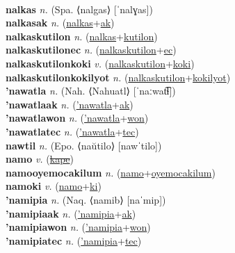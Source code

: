  \label{'nayciwiawon} \\
\textbf{nalkas} \textit{n.} (Spa. ⟨nalgas⟩ [ˈnalɣas])
 \label{nalkas} \\
\textbf{nalkasak} \textit{n.} (\hyperref[nalkas]{nalkas}+\hyperref[ak]{ak})
 \label{nalkasak} \\
\textbf{nalkaskutilon} \textit{n.} (\hyperref[nalkas]{nalkas}+\hyperref[kutilon]{kutilon})
 \label{nalkaskutilon} \\
\textbf{nalkaskutilonec} \textit{n.} (\hyperref[nalkaskutilon]{nalkaskutilon}+\hyperref[ec]{ec})
 \label{nalkaskutilonec} \\
\textbf{nalkaskutilonkoki} \textit{v.} (\hyperref[nalkaskutilon]{nalkaskutilon}+\hyperref[koki]{koki})
 \label{nalkaskutilonkoki} \\
\textbf{nalkaskutilonkokilyot} \textit{n.} (\hyperref[nalkaskutilon]{nalkaskutilon}+\hyperref[kokilyot]{kokilyot})
 \label{nalkaskutilonkokilyot} \\
\textbf{'nawatla} \textit{n.} (Nah. ⟨Nahuatl⟩ [ˈnaːwat͡ɬ])
 \label{'nawatla} \\
\textbf{'nawatlaak} \textit{n.} (\hyperref['nawatla]{'nawatla}+\hyperref[ak]{ak})
 \label{'nawatlaak} \\
\textbf{'nawatlawon} \textit{n.} (\hyperref['nawatla]{'nawatla}+\hyperref[won]{won})
 \label{'nawatlawon} \\
\textbf{'nawatlatec} \textit{n.} (\hyperref['nawatla]{'nawatla}+\hyperref[tec]{tec})
 \label{'nawatlatec} \\
\textbf{nawtil} \textit{n.} (Epo. ⟨naŭtilo⟩ [nawˈtilo])
 \label{nawtil} \\
\textbf{namo} \textit{v.} (\hyperref[kape]{\sout{kape}})
 \label{namo} \\
\textbf{namooyemocakilum} \textit{n.} (\hyperref[namo]{namo}+\hyperref[oyemocakilum]{oyemocakilum})
 \label{namooyemocakilum} \\
\textbf{namoki} \textit{v.} (\hyperref[namo]{namo}+\hyperref[ki]{ki})
 \label{namoki} \\
\textbf{'namipia} \textit{n.} (Naq. ⟨namib⟩ [naˈmip])
 \label{'namipia} \\
\textbf{'namipiaak} \textit{n.} (\hyperref['namipia]{'namipia}+\hyperref[ak]{ak})
 \label{'namipiaak} \\
\textbf{'namipiawon} \textit{n.} (\hyperref['namipia]{'namipia}+\hyperref[won]{won})
 \label{'namipiawon} \\
\textbf{'namipiatec} \textit{n.} (\hyperref['namipia]{'namipia}+\hyperref[tec]{tec})
 \label{'namipiatec} \\
